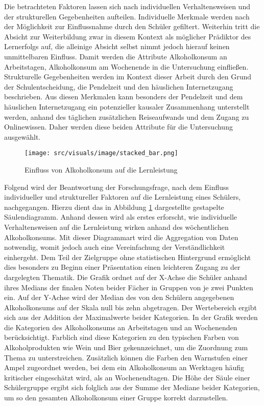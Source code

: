 Die betrachteten Faktoren lassen sich nach individuellen Verhaltensweisen und der strukturellen Gegebenheiten aufteilen.
Individuelle Merkmale werden nach der Möglichkeit zur Einflussnahme durch den Schüler gefiltert.
Weiterhin tritt die Absicht zur Weiterbildung zwar in diesem Kontext als möglicher Prädiktor des Lernerfolgs auf, die alleinige Absicht selbst nimmt jedoch hierauf keinen unmittelbaren Einfluss.
Damit werden die Attribute {Alkoholkonsum an Arbeitstagen, Alkoholkonsum am Wochenende} in die Untersuchung einfließen.
Strukturelle Gegebenheiten werden im Kontext dieser Arbeit durch den Grund der Schulentscheidung, die Pendelzeit und den häuslichen Internetzugang beschrieben.
Aus diesen Merkmalen kann besonders der {Pendelzeit} und dem {häuslichen Internetzugang} ein potenzieller kausaler Zusammenhang unterstellt werden, anhand des täglichen zusätzlichen Reiseaufwands und dem Zugang zu Onlinewissen.
Daher werden diese beiden Attribute für die Untersuchung ausgewählt.

\clearpage
\begin{figure}[htb]
    \centering
    \texttt{[image: src/visuals/image/stacked\_bar.png]}
    \caption{Einfluss von Alkoholkonsum auf die Lernleistung}
    \label{fig:stacked_bar}
\end{figure}

Folgend wird der Beantwortung der Forschungsfrage, nach dem Einfluss individueller und struktureller Faktoren auf die Lernleistung eines Schülers, nachgegangen. 
Hierzu dient das in Abbildung \ref{fig:stacked_bar} dargestellte gestapelte Säulendiagramm.
Anhand dessen wird als erstes erforscht, wie individuelle Verhaltensweisen auf die Lernleistung wirken anhand des wöchentlichen Alkoholkonsums.
Mit dieser Diagrammart wird die Aggregation von Daten notwendig, womit jedoch auch eine Vereinfachung der Verständlichkeit einhergeht.
Dem Teil der Zielgruppe ohne statistischen Hintergrund ermöglicht dies besonders zu Beginn einer Präsentation einen leichteren Zugang zu der dargelegten Thematik.
Die Grafik ordnet auf der X-Achse die Schüler anhand ihres Medians der finalen Noten beider Fächer in Gruppen von je zwei Punkten ein.
Auf der Y-Achse wird der Median des von den Schülern angegebenen Alkoholkonsums auf der Skala null bis zehn abgetragen.
Der Wertebereich ergibt sich aus der Addition der Maximalwerte beider Kategorien.
In der Grafik werden die Kategorien des Alkoholkonsums an Arbeitstagen und an Wochenenden berücksichtigt.
Farblich sind diese Kategorien zu den typischen Farben von Alkoholprodukten wie Wein und Bier gekennzeichnet, um die Zuordnung zum Thema zu unterstreichen.
Zusätzlich können die Farben den Warnstufen einer Ampel zugeordnet werden, bei dem ein Alkoholkonsum an Werktagen häufig kritischer eingeschätzt wird, als an Wochenendtagen.
Die Höhe der Säule einer Schülergruppe ergibt sich folglich aus der Summe der Mediane beider Kategorien, um so den gesamten Alkoholkonsum einer Gruppe korrekt darzustellen.

